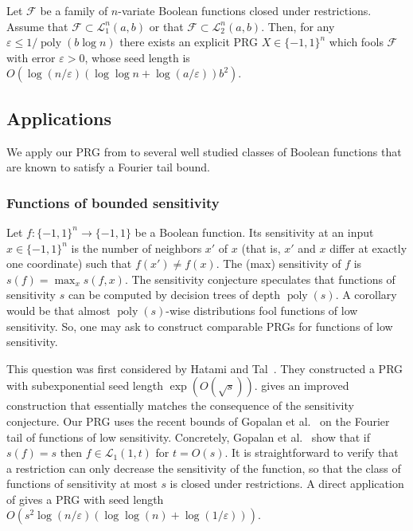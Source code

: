 \documentclass{toc}
\newcommand{\FF}{\mathcal{F}}
\newcommand{\LL}{\mathcal{L}}
\newcommand{\eps}{\varepsilon}
\DeclareMathOperator{\poly}{poly}      %
\begin{document}
\begin{theorem}
\label{thm:L1}
Let $\FF$ be a family of $n$-variate Boolean functions closed under restrictions. Assume that $\FF \subset \LL_1^n(a,b)$ or that $\FF \subset \LL_2^n(a,b)$.
	Then, for any $\eps\leq {1}/{\poly(b \log n)}$ there exists an explicit PRG $X \in \{-1,1\}^n$ which fools $\FF$ with error $\eps>0$,
whose seed length is $O(\log(n/\eps)  (\log\log n + \log(a/\eps)) b^2)$.
\end{theorem}

\subsection{Applications}
We apply our PRG from  to several well studied classes of Boolean functions that are known to satisfy a Fourier tail bound.

\subsubsection{Functions of bounded sensitivity}
Let $f:\{-1,1\}^n \to \{-1,1\}$ be a Boolean function. Its sensitivity at an input $x \in \{-1,1\}^n$ is the number of neighbors $x'$ of $x$
(that is, $x'$ and $x$ differ at exactly one coordinate)
such that $f(x') \ne f(x)$. The (max) sensitivity of $f$ is $s(f)=\max_x s(f,x)$. The sensitivity conjecture speculates
that functions of sensitivity $s$ can be computed by decision trees of depth $\poly(s)$. A corollary would be that almost $\poly(s)$-wise
distributions fool functions of low sensitivity. So, one may ask to construct comparable PRGs for functions of low sensitivity.

This question was first considered by Hatami and Tal~\cite{hatami2017pseudorandom}. They constructed a PRG with subexponential seed length
$\exp(O(\sqrt{s}))$.  gives an improved construction that essentially matches the consequence of the sensitivity conjecture. Our PRG uses the recent bounds of Gopalan {et al.}~\cite{gopalan2016degree}
on the Fourier tail of functions of low sensitivity. Concretely,
Gopalan {et al.}~\cite{gopalan2016degree} show that if $s(f)=s$ then $f \in \LL_1(1,t)$ for $t=O(s)$.
It is straightforward to verify that a restriction can only decrease the sensitivity of the function, so that the
class of functions of sensitivity at most $s$ is closed under restrictions.
A direct application of  gives a PRG with seed length $O(s^2 \log(n/\eps) (\log\log(n) + \log(1/\eps)))$.
\end{document}
